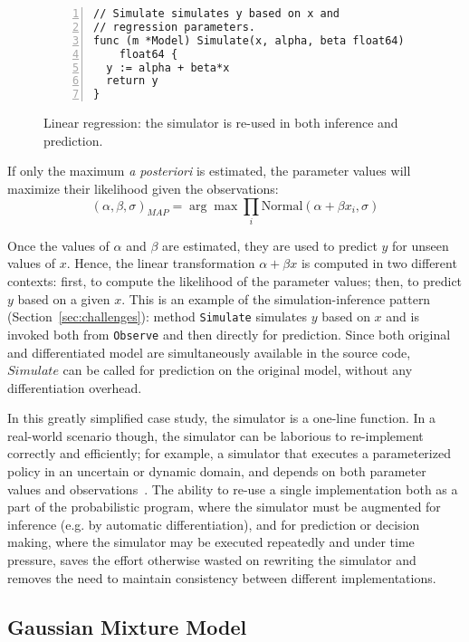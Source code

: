 \documentclass[sigplan,review,10pt,anonymous]{acmart}
\begin{document}
\begin{sloppypar}
\begin{figure}
\begin{lstlisting}[framexleftmargin=10pt,numbers=left]
// Simulate simulates y based on x and 
// regression parameters.
func (m *Model) Simulate(x, alpha, beta float64)
    float64 {
  y := alpha + beta*x
  return y
}
\end{lstlisting}
\caption{Linear regression: the simulator is re-used in both
  inference and prediction.}
\label{fig:linear-regression}
\end{figure}
If only the maximum \textit{a posteriori} is estimated, the
parameter values will maximize their likelihood given the
observations:
\begin{equation}
	(\alpha, \beta, \sigma)_{MAP} = \arg \max \prod\limits_i \mathrm{Normal}(\alpha + \beta x_i, \sigma)
	\label{eqn:linear-regression-2}
\end{equation}

Once the values of $\alpha$ and $\beta$ are estimated, they are
used to predict $y$ for unseen values of $x$. Hence, the linear
transformation $\alpha + \beta x$ is computed in two different
contexts: first, to compute the likelihood of the parameter
values; then, to predict $y$ based on a given $x$. This is an
example of the simulation-inference pattern
(Section~\ref{sec:challenges}): method \lstinline{Simulate}
simulates $y$ based on $x$ and is invoked both from
\lstinline{Observe} and then directly for prediction.  Since
both original and differentiated model are simultaneously
available in the source code, $Simulate$ can be called
for prediction on the original model, without any
differentiation overhead. 

In this greatly simplified case study, the simulator is a
one-line function. In a real-world scenario though, the
simulator can be laborious to re-implement correctly and
efficiently; for example, a simulator that executes a
parameterized policy in an uncertain or dynamic domain, and
depends on both parameter values and observations~\cite{MPT+16}.
The ability to re-use a single implementation both as a part of
the probabilistic program, where the simulator must be augmented
for inference (e.g. by automatic differentiation), and for
prediction or decision making, where the simulator may be
executed repeatedly and under time pressure, saves the effort
otherwise wasted on rewriting the simulator and removes the need
to maintain consistency between different implementations.

\subsection{Gaussian Mixture Model}
\label{sec:gaussian-mixture}


\end{sloppypar}
\end{document}
